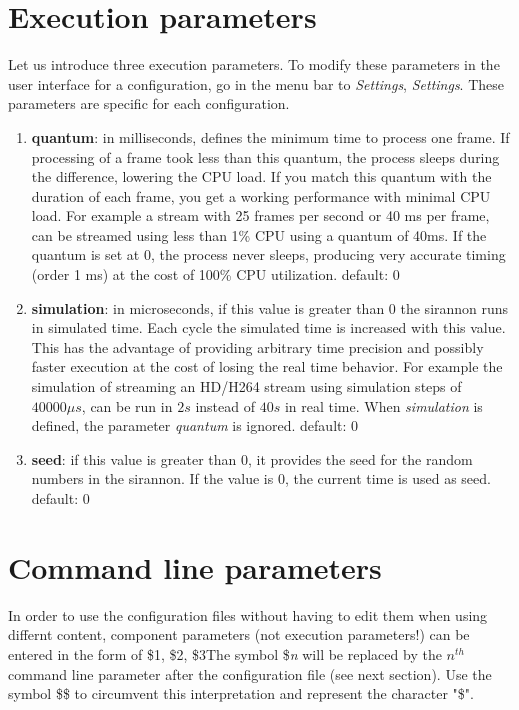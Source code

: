 \documentclass[12pt]{report}
\begin{document}
\section{Execution parameters} 
Let us introduce three execution parameters. To modify these parameters in the user interface for a configuration, go in the menu bar to \textit{Settings}, \textit{Settings}. These parameters are specific for each configuration.
\begin{enumerate}
\item\textbf{quantum}: in milliseconds, defines the minimum time to process one frame. If processing of a frame took less than this quantum, the process sleeps during the difference, lowering the CPU load. If you match this quantum with the duration of each frame, you get a working performance with minimal CPU load. For example a stream with 25 frames per second or 40 ms per frame, can be streamed using less than 1\% CPU using a quantum of 40ms. If the quantum is set at 0, the process never sleeps, producing very accurate timing (order 1 ms) at the cost of 100\% CPU utilization. default: 0

\item\textbf{simulation}: in microseconds, if this value is greater than 0 the sirannon runs in simulated time. Each cycle the simulated time is increased with this value. This has the advantage of providing arbitrary time precision and possibly faster execution at the cost of losing the real time behavior. For example the simulation of streaming an HD/H264 stream using simulation steps of $40000\mu s$, can be run in $2s$ instead of $40s$ in real time. When \textit{simulation} is defined, the parameter \textit{quantum} is ignored. default: 0

\item\textbf{seed}: if this value is greater than 0, it provides the seed for the random numbers in the sirannon. If the value is 0, the current time is used as seed. default: 0
\end{enumerate}

\section{Command line parameters}
In order to use the configuration files without having to edit them when using differnt content, component parameters (not execution parameters!) can be entered in the form of \$1, \$2, \$3\textellipsis The symbol \$\textit{n} will be replaced by the $n^{th}$ command line parameter after the configuration file (see next section). Use the symbol \$\$ to circumvent this interpretation and represent the character "\$".
\end{document}
